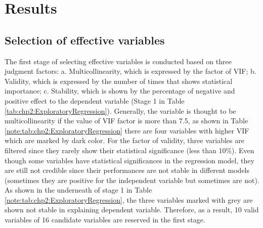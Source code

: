 %
\section{Results}
\subsection{Selection of effective variables}
%
The first stage of selecting effective variables is conducted based on three judgment factors: a. Multicollinearity, which is expressed by the factor of VIF; b. Validity, which is expressed by the number of times that shows statistical importance; c. Stability, which is shown by the percentage of negative and positive effect to the dependent variable (Stage 1 in Table \ref{tab:chp2:ExploratoryRegression}). Generally, the variable is thought to be multicollinearity if the value of VIF factor is more than 7.5, as shown in Table \ref{note:tab:chp2:ExploratoryRegression} there are four variables with higher VIF which are marked by dark color. For the factor of validity, three variables are filtered since they rarely show their statistical significance (less than 10\%). Even though some variables have statistical significances in the regression model, they are still not credible since their performances are not stable in different models (sometimes they are positive for the independent variable but sometimes are not). As shown in the underneath of stage 1 in Table \ref{note:tab:chp2:ExploratoryRegression}, the three variables marked with grey are shown not stable in explaining dependent variable. Therefore, as a result, 10 valid variables of 16 candidate variables are reserved in the first stage.

